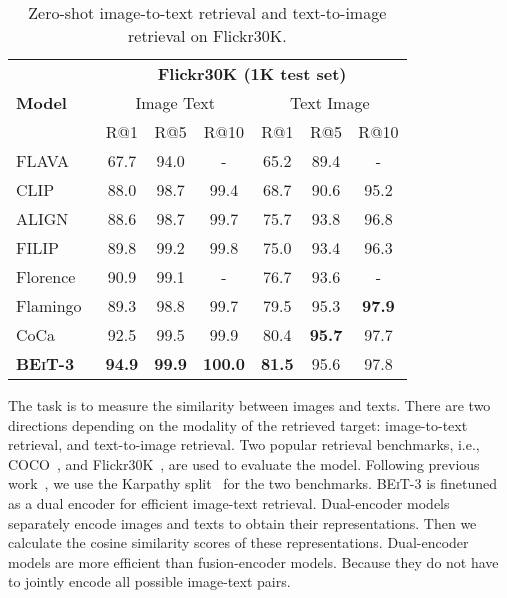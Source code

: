 \documentclass{article}
\newcommand\our{\textsc{BEiT-3}}
\begin{document}
\begin{table*}[t]
\centering
\begin{tabular}{@{}l@{\hskip4pt} @{ \hskip4pt}c@{\hskip4pt} @{\hskip4pt}c@{\hskip4pt} @{\hskip4pt}c@{\hskip4pt} @{\hskip4pt}c@{\hskip4pt} @{\hskip4pt}c@{\hskip4pt} @{\hskip4pt}c@{}}
\toprule
\multirow{3}{*}{\bf Model} & \multicolumn{6}{c}{\bf Flickr30K (1K test set)} \\
 & \multicolumn{3}{c}{Image  Text} & \multicolumn{3}{c}{Text  Image} \\
 \cmidrule(lr){2-4} \cmidrule(lr){5-7}
 & R@1 & R@5 & R@10 & R@1 & R@5 & R@10 \\
\midrule
FLAVA~\citep{flava} & 67.7 & 94.0 & - & 65.2 & 89.4 & - \\
CLIP~\citep{clip} & 88.0 & 98.7 & 99.4 & 68.7 & 90.6 & 95.2 \\
ALIGN~\citep{align} & 88.6 & 98.7 & 99.7 & 75.7 & 93.8 & 96.8 \\
FILIP~\citep{filip} & 89.8 & 99.2 & 99.8 & 75.0 & 93.4 & 96.3 \\
Florence~\citep{florence} & 90.9 & 99.1 & - & 76.7 & 93.6 & - \\
Flamingo~\citep{flamingo} & 89.3 & 98.8 & 99.7 & 79.5 & 95.3 & \bf 97.9 \\
CoCa~\citep{coca} & 92.5 & 99.5 & 99.9 & 80.4 & \bf 95.7 & 97.7 \\
\midrule
\bf \our{} & \bf 94.9 & \bf 99.9 & \bf 100.0 & \bf 81.5 & 95.6 & 97.8 \\
\bottomrule
\end{tabular}
\caption{
Zero-shot image-to-text retrieval and text-to-image retrieval on Flickr30K.
}
\label{tbl:results:zeroshot_retrieval}
\end{table*}

The task is to measure the similarity between images and texts.
There are two directions depending on the modality of the retrieved target: image-to-text retrieval, and text-to-image retrieval.
Two popular retrieval benchmarks, i.e., COCO~\citep{coco}, and Flickr30K~\citep{flickr30k}, are used to evaluate the model.
Following previous work~\citep{vinvl,vilt}, we use the Karpathy split~\citep{karpathysplit} for the two benchmarks.
\our{} is finetuned as a dual encoder for efficient image-text retrieval.
Dual-encoder models separately encode images and texts to obtain their representations. Then we calculate the cosine similarity scores of these representations.
Dual-encoder models are more efficient than fusion-encoder models. Because they do not have to jointly encode all possible image-text pairs.
\end{document}
